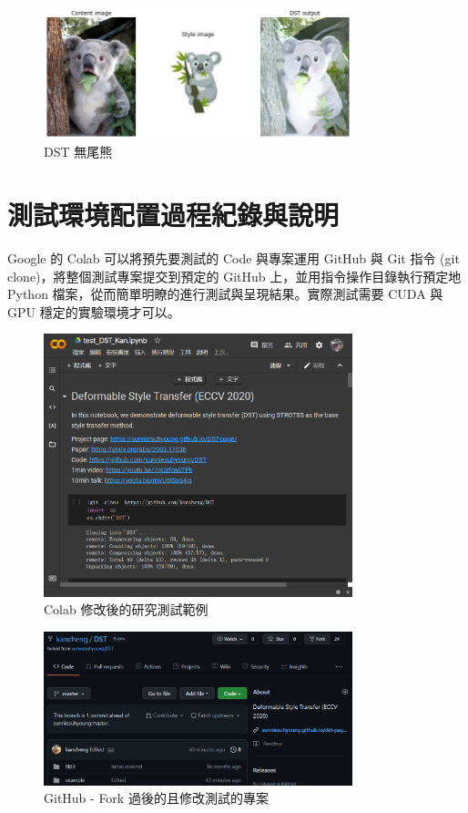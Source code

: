 \documentclass[10pt,UTF8]{ctexart}
\begin{document}
\begin{figure}[H]
\centering 
\includegraphics[width=0.80\textwidth]{t3.png} 
\caption{DST 無尾熊}
\label{Test}
\end{figure}

\newpage

\section{測試環境配置過程紀錄與說明}

Google 的 Colab 可以將預先要測試的 Code 與專案運用 GitHub 與 Git 指令 (git clone)，將整個測試專案提交到預定的 GitHub 上，並用指令操作目錄執行預定地 Python 檔案，從而簡單明瞭的進行測試與呈現結果。實際測試需要 CUDA 與 GPU 穩定的實驗環境才可以。

\begin{figure}[H]
\centering 
\includegraphics[width=0.80\textwidth]{c1.png} 
\caption{Colab 修改後的研究測試範例}
\label{Test}
\end{figure}

\begin{figure}[H]
\centering 
\includegraphics[width=0.80\textwidth]{c2.png} 
\caption{GitHub - Fork 過後的且修改測試的專案}
\label{Test}
\end{figure}
\end{document}
